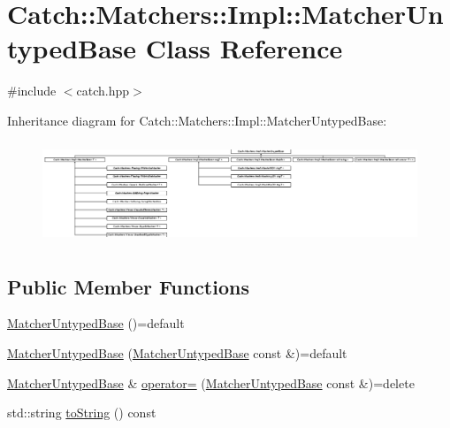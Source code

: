 \hypertarget{class_catch_1_1_matchers_1_1_impl_1_1_matcher_untyped_base}{}\section{Catch\+:\+:Matchers\+:\+:Impl\+:\+:Matcher\+Untyped\+Base Class Reference}
\label{class_catch_1_1_matchers_1_1_impl_1_1_matcher_untyped_base}


{\ttfamily \#include $<$catch.\+hpp$>$}

Inheritance diagram for Catch\+:\+:Matchers\+:\+:Impl\+:\+:Matcher\+Untyped\+Base\+:\begin{figure}[H]
\begin{center}
\leavevmode
\includegraphics[height=3.046489cm]{class_catch_1_1_matchers_1_1_impl_1_1_matcher_untyped_base}
\end{center}
\end{figure}
\subsection*{Public Member Functions}
\begin{DoxyCompactItemize}
\item 
\mbox{\hyperlink{class_catch_1_1_matchers_1_1_impl_1_1_matcher_untyped_base_ab65764dc245d85e2b268d3be870b650a}{Matcher\+Untyped\+Base}} ()=default
\item 
\mbox{\hyperlink{class_catch_1_1_matchers_1_1_impl_1_1_matcher_untyped_base_a985fd3c3ffcc9f2e8dc7a330130040b0}{Matcher\+Untyped\+Base}} (\mbox{\hyperlink{class_catch_1_1_matchers_1_1_impl_1_1_matcher_untyped_base}{Matcher\+Untyped\+Base}} const \&)=default
\item 
\mbox{\hyperlink{class_catch_1_1_matchers_1_1_impl_1_1_matcher_untyped_base}{Matcher\+Untyped\+Base}} \& \mbox{\hyperlink{class_catch_1_1_matchers_1_1_impl_1_1_matcher_untyped_base_a62668ccc47b64a9094dcb6413f9af80b}{operator=}} (\mbox{\hyperlink{class_catch_1_1_matchers_1_1_impl_1_1_matcher_untyped_base}{Matcher\+Untyped\+Base}} const \&)=delete
\item 
std\+::string \mbox{\hyperlink{class_catch_1_1_matchers_1_1_impl_1_1_matcher_untyped_base_a5982c7c80ca71dfe2298babadad7a453}{to\+String}} () const
\end{DoxyCompactItemize}
